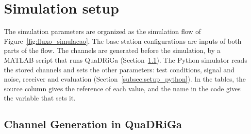 %
%

\section{Simulation setup}
The simulation parameters are organized as the simulation flow of Figure~\ref{fig:fluxo_simulacao}. The base station configurations are inputs of both parts of the flow. The channels are generated before the simulation, by a MATLAB script that runs QuaDRiGa (Section~\ref{subsec:setup_canal}). The Python simulator reads the stored channels and sets the other parameters: test conditions, signal and noise, receiver and evaluation (Section~\ref{subsec:setup_python}). In the tables, the source column gives the reference of each value, and the name in the code gives the variable that sets it.






\subsection{Channel Generation in QuaDRiGa}\label{subsec:setup_canal}

